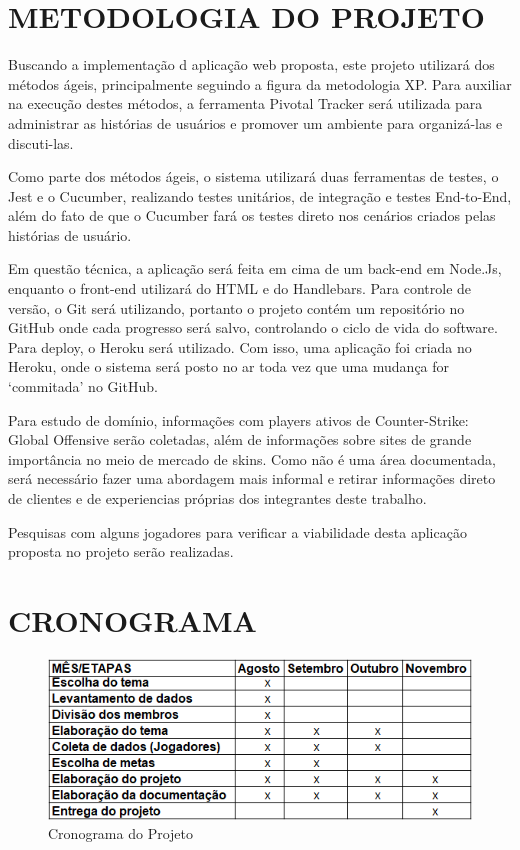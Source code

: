 \documentclass[a4paper, 12pt]{article}
\begin{document}
    \section{METODOLOGIA DO PROJETO}
    Buscando a implementação d aplicação web proposta, este projeto utilizará dos métodos ágeis, principalmente seguindo a figura da metodologia XP. Para auxiliar na execução destes métodos, a ferramenta Pivotal Tracker será utilizada para administrar as histórias de usuários e promover um ambiente para organizá-las e discuti-las.
    
    Como parte dos métodos ágeis, o sistema utilizará duas ferramentas de testes, o Jest e o Cucumber, realizando testes unitários, de integração e testes End-to-End, além do fato de que o Cucumber fará os testes direto nos cenários criados pelas histórias de usuário.
    
    Em questão técnica, a aplicação será feita em cima de um back-end em Node.Js, enquanto o front-end utilizará do HTML e do Handlebars. Para controle de versão, o Git será utilizando, portanto o projeto contém um repositório no GitHub onde cada progresso será salvo, controlando o ciclo de vida do software. Para deploy, o Heroku será utilizado. Com isso, uma aplicação foi criada no Heroku, onde o sistema será posto no ar toda vez que uma mudança for ‘commitada’ no GitHub.
    
    Para estudo de domínio, informações com players ativos de Counter-Strike: Global Offensive serão coletadas, além de informações sobre sites de grande importância no meio de mercado de skins. Como não é uma área documentada, será necessário fazer uma abordagem mais informal e retirar informações direto de clientes e de experiencias próprias dos integrantes deste trabalho.
    
    Pesquisas com alguns jogadores para verificar a viabilidade desta aplicação proposta no projeto serão realizadas.
    
    \section{CRONOGRAMA}
    \begin{figure}[!htb]
        \centering
        \includegraphics[scale=0.6]{Imagens/Cronograma.png}
        \caption{Cronograma do Projeto}
    \end{figure}
    
\end{document}
